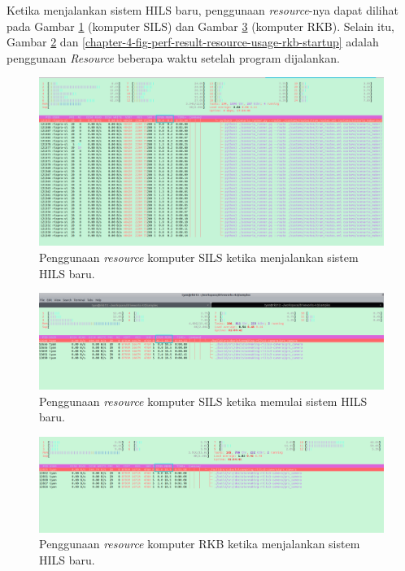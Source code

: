 Ketika menjalankan sistem HILS baru, penggunaan \textit{resource}-nya dapat
dilihat pada Gambar
\ref{chapter-4-fig-perf-result-resource-usage-sils} (komputer SILS) dan Gambar
\ref{chapter-4-fig-perf-result-resource-usage-rkb} (komputer RKB). Selain itu,
Gambar \ref{chapter-4-fig-perf-result-resource-usage-sils-startup} dan
\ref{chapter-4-fig-perf-result-resource-usage-rkb-startup} adalah penggunaan
\textit{Resource} beberapa waktu setelah program dijalankan.
\begin{figure}[!htbp]
	\centering
	\includegraphics[width=1.0\textwidth]{resources/chapter-4/resource-usage-new-hils-sils-startup.png}
	\caption{Penggunaan \textit{resource} komputer SILS ketika menjalankan sistem HILS baru.}
	\label{chapter-4-fig-perf-result-resource-usage-sils}
\end{figure}
\begin{figure}[!htbp]
	\centering
	\includegraphics[width=1.0\textwidth,trim={0cm 0cm 0cm 2.5cm},clip]{resources/chapter-4/resource-usage-new-hils-rkb.png}
	\caption{Penggunaan \textit{resource} komputer SILS ketika memulai sistem HILS baru.}
	\label{chapter-4-fig-perf-result-resource-usage-sils-startup}
\end{figure}
\begin{figure}[!htbp]
	\centering
	\includegraphics[width=1.0\textwidth]{resources/chapter-4/resource-usage-new-hils-rkb-startup.png}
	\caption{Penggunaan \textit{resource} komputer RKB ketika menjalankan sistem HILS baru.}
	\label{chapter-4-fig-perf-result-resource-usage-rkb}
\end{figure}
